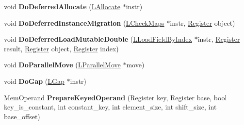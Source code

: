 \begin{DoxyCompactItemize}
\item 
void {\bfseries Do\+Deferred\+Allocate} (\hyperlink{classv8_1_1internal_1_1_l_allocate}{L\+Allocate} $\ast$instr)\hypertarget{classv8_1_1internal_1_1_l_code_gen_a5a708933d9b086e295c8bf902f66033e}{}\label{classv8_1_1internal_1_1_l_code_gen_a5a708933d9b086e295c8bf902f66033e}

\item 
void {\bfseries Do\+Deferred\+Instance\+Migration} (\hyperlink{classv8_1_1internal_1_1_l_check_maps}{L\+Check\+Maps} $\ast$instr, \hyperlink{structv8_1_1internal_1_1_register}{Register} object)\hypertarget{classv8_1_1internal_1_1_l_code_gen_a9a11a557dc4a35165efe7432b91cce0c}{}\label{classv8_1_1internal_1_1_l_code_gen_a9a11a557dc4a35165efe7432b91cce0c}

\item 
void {\bfseries Do\+Deferred\+Load\+Mutable\+Double} (\hyperlink{classv8_1_1internal_1_1_l_load_field_by_index}{L\+Load\+Field\+By\+Index} $\ast$instr, \hyperlink{structv8_1_1internal_1_1_register}{Register} result, \hyperlink{structv8_1_1internal_1_1_register}{Register} object, \hyperlink{structv8_1_1internal_1_1_register}{Register} index)\hypertarget{classv8_1_1internal_1_1_l_code_gen_a9a814347358bb30ae26293358697e12f}{}\label{classv8_1_1internal_1_1_l_code_gen_a9a814347358bb30ae26293358697e12f}

\item 
void {\bfseries Do\+Parallel\+Move} (\hyperlink{classv8_1_1internal_1_1_l_parallel_move}{L\+Parallel\+Move} $\ast$move)\hypertarget{classv8_1_1internal_1_1_l_code_gen_ac76d169118f379bb8eb597ec360ca6e1}{}\label{classv8_1_1internal_1_1_l_code_gen_ac76d169118f379bb8eb597ec360ca6e1}

\item 
void {\bfseries Do\+Gap} (\hyperlink{classv8_1_1internal_1_1_l_gap}{L\+Gap} $\ast$instr)\hypertarget{classv8_1_1internal_1_1_l_code_gen_a349f26d8f5d21ea5ef25e7855317a575}{}\label{classv8_1_1internal_1_1_l_code_gen_a349f26d8f5d21ea5ef25e7855317a575}

\item 
\hyperlink{classv8_1_1internal_1_1_mem_operand}{Mem\+Operand} {\bfseries Prepare\+Keyed\+Operand} (\hyperlink{structv8_1_1internal_1_1_register}{Register} key, \hyperlink{structv8_1_1internal_1_1_register}{Register} base, bool key\+\_\+is\+\_\+constant, int constant\+\_\+key, int element\+\_\+size, int shift\+\_\+size, int base\+\_\+offset)\hypertarget{classv8_1_1internal_1_1_l_code_gen_a3b515037866a0dd7cc3f92d474c36b43}{}\label{classv8_1_1internal_1_1_l_code_gen_a3b515037866a0dd7cc3f92d474c36b43}


\end{DoxyCompactItemize}
